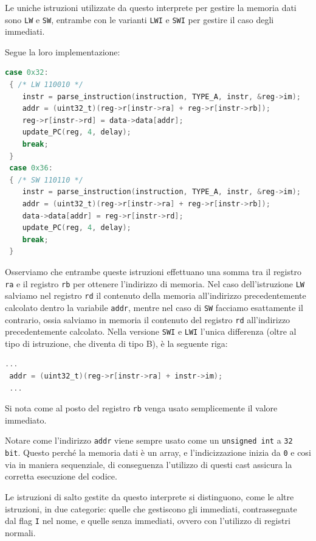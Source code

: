 \vspace{0.3cm} 

Le uniche istruzioni utilizzate da questo interprete per gestire la memoria dati sono \texttt{LW} e \texttt{SW}, entrambe con le varianti \texttt{LWI} e \texttt{SWI} per gestire il caso degli immediati.

\noindent Segue la loro implementazione:
\begin{lstlisting}[language=C]
 case 0x32:
 { /* LW 110010 */
    instr = parse_instruction(instruction, TYPE_A, instr, &reg->im);
    addr = (uint32_t)(reg->r[instr->ra] + reg->r[instr->rb]);
    reg->r[instr->rd] = data->data[addr];
    update_PC(reg, 4, delay);
    break;
 }
 case 0x36:
 { /* SW 110110 */
    instr = parse_instruction(instruction, TYPE_A, instr, &reg->im);
    addr = (uint32_t)(reg->r[instr->ra] + reg->r[instr->rb]);
    data->data[addr] = reg->r[instr->rd];
    update_PC(reg, 4, delay);
    break;
 }
\end{lstlisting}
Osserviamo che entrambe queste istruzioni effettuano una somma tra il registro \texttt{ra} e il registro \texttt{rb} per ottenere l'indirizzo di memoria. Nel caso dell'istruzione \texttt{LW} salviamo nel registro \texttt{rd} il contenuto della memoria all'indirizzo precedentemente calcolato dentro la variabile \texttt{addr}, mentre nel caso di \texttt{SW} facciamo esattamente il contrario, ossia salviamo in memoria il contenuto del registro \texttt{rd} all'indirizzo precedentemente calcolato.
Nella versione \texttt{SWI} e \texttt{LWI} l'unica differenza (oltre al tipo di istruzione, che diventa di tipo B), è la seguente riga:
\begin{lstlisting}[language=C]
 ...
 addr = (uint32_t)(reg->r[instr->ra] + instr->im);
 ...
\end{lstlisting}
Si nota come al posto del registro \texttt{rb} venga usato semplicemente il valore immediato.

Notare come l'indirizzo \texttt{addr} viene sempre usato come un \texttt{unsigned int} a \texttt{32 bit}. Questo perché la memoria dati è un array, e l'indicizzazione inizia da \texttt{0} e cosi via in maniera sequenziale, di conseguenza l'utilizzo di questi cast assicura la corretta esecuzione del codice.

\vspace{0.3cm}

Le istruzioni di salto gestite da questo interprete si distinguono, come le altre istruzioni, in due categorie: quelle che gestiscono gli immediati, contrassegnate dal flag \texttt{I} nel nome, e quelle senza immediati, ovvero con l'utilizzo di registri normali. 

